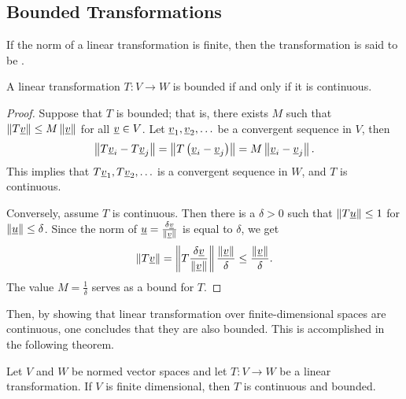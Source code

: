 \subsection{Bounded Transformations}

\begin{definition}
If the norm of a linear transformation is finite, then the transformation is said to be .
\end{definition}

\begin{theorem}
A linear transformation $T : V \rightarrow W$ is bounded if and only if it is continuous.
\end{theorem}
\begin{proof}
Suppose that $T$ is bounded; that is, there exists $M$ such that  $\left\| T \underline{v} \right\| \leq M \left\| \underline{v} \right\|$ for all $\underline{v} \in V$.
Let $\underline{v}_1, \underline{v}_2, \ldots$ be a convergent sequence in $V$, then
\begin{equation*}
\left\| T \underline{v}_i - T \underline{v}_j \right\|
= \left\| T \left( \underline{v}_i - \underline{v}_j \right) \right\|
= M \left\| \underline{v}_i - \underline{v}_j \right\| .
\end{equation*}
This implies that $T \underline{v}_1, T \underline{v}_2, \ldots$ is a convergent sequence in $W$, and $T$ is continuous.

Conversely, assume $T$ is continuous.
Then there is a $\delta > 0$ such that $\left\| T \underline{u} \right\| \leq 1$ for $\left\| \underline{u} \right\| \leq \delta$.
Since the norm of $\underline{u} = \frac{ \delta \underline{v} }{ \left\| \underline{v} \right\| }$ is equal to $\delta$, we get
\begin{equation*}
\left\| T \underline{v} \right\|
= \left\| T \frac{ \delta \underline{v} }{ \left\| \underline{v} \right\| } \right\|
\frac{ \left\| \underline{v} \right\| }{ \delta }
\leq \frac{ \left\| \underline{v} \right\| }{ \delta } .
\end{equation*}
The value $M = \frac{1}{\delta}$ serves as a bound for $T$.
\end{proof}

Then, by showing that linear transformation over finite-dimensional spaces are continuous, one concludes that they are also bounded.
This is accomplished in the following theorem.

\begin{theorem}
Let $V$ and $W$ be normed vector spaces and let $T : V \rightarrow W$ be a linear transformation.
If $V$ is finite dimensional, then $T$ is continuous and bounded.
\end{theorem}

